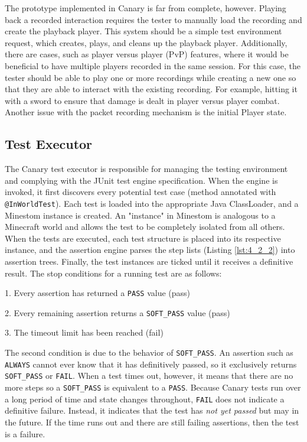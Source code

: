 \documentclass[12pt]{article}
\def\code#1{\texttt{#1}}
\begin{document}
\begin{onehalfspacing}
The prototype implemented in Canary is far from complete, however.
Playing back a recorded interaction requires the tester to manually load
the recording and create the playback player. This system should be a
simple test environment request, which creates, plays, and cleans up the
playback player. Additionally, there are cases, such as player versus
player (PvP) features, where it would be beneficial to have multiple
players recorded in the same session. For this case, the tester should
be able to play one or more recordings while creating a new one so that
they are able to interact with the existing recording. For example,
hitting it with a sword to ensure that damage is dealt in player versus
player combat. Another issue with the packet recording mechanism is the
initial Player state.

\subsection{Test Executor}\label{testex}

The Canary test executor is responsible for managing the testing
environment and complying with the JUnit test engine specification. When
the engine is invoked, it first discovers every potential test case
(method annotated with \code{@InWorldTest}). Each test is loaded into the
appropriate Java ClassLoader, and a Minestom instance is created. An
"instance" in Minestom is analogous to a Minecraft world and allows the
test to be completely isolated from all others. When the tests are
executed, each test structure is placed into its respective instance,
and the assertion engine parses the step lists (Listing \ref{lst:4_2_2}) into
assertion trees. Finally, the test instances are ticked until it
receives a definitive result. The stop conditions for a running test are
as follows:

1. Every assertion has returned a \code{PASS} value (pass)

2. Every remaining assertion returns a \code{SOFT\_PASS} value (pass)

3. The timeout limit has been reached (fail)

The second condition is due to the behavior of \code{SOFT\_PASS}. An assertion
such as \code{ALWAYS} cannot ever know that it has definitively passed, so it
exclusively returns \code{SOFT\_PASS} or \code{FAIL}. When a test times out, 
however, it means that there are no more steps so a \code{SOFT\_PASS} is
equivalent to a \code{PASS}. Because Canary tests run over a long period of time 
and state changes throughout, \code{FAIL} does not indicate a definitive failure.
Instead, it indicates that the test has \emph{not yet passed} but may in
the future. If the time runs out and there are still failing assertions,
then the test is a failure.


\end{onehalfspacing}
\end{document}
